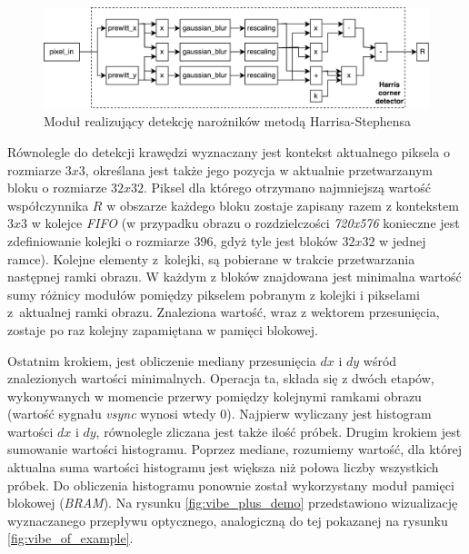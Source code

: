	\begin{figure}[h!]
		\centering
		\includegraphics[scale=0.6]{img/4/harris_detector.pdf}
		\caption{Moduł realizujący detekcję narożników metodą Harrisa-Stephensa}
		\label{fig:harris_diagram}
	\end{figure}

Równolegle do detekcji krawędzi wyznaczany jest kontekst aktualnego piksela o rozmiarze $3x3$, określana jest także jego pozycja w aktualnie przetwarzanym bloku o rozmiarze $32x32$. Piksel dla którego otrzymano najmniejszą wartość współczynnika $R$ w obszarze każdego bloku zostaje zapisany razem z kontekstem $3x3$ w kolejce \textit{FIFO} (w przypadku obrazu o rozdzielczości \textit{720x576} konieczne jest zdefiniowanie kolejki o rozmiarze 396, gdyż tyle jest bloków $32x32$ w jednej ramce). Kolejne elementy z~kolejki, są pobierane w trakcie przetwarzania następnej ramki obrazu. W każdym z bloków znajdowana jest minimalna wartość sumy różnicy modułów pomiędzy pikselem pobranym z kolejki i pikselami z~aktualnej ramki obrazu. Znaleziona wartość, wraz z wektorem przesunięcia, zostaje po raz kolejny zapamiętana w pamięci blokowej. 

Ostatnim krokiem, jest obliczenie mediany przesunięcia $dx$ i $dy$ wśród znalezionych wartości minimalnych. Operacja ta, składa się z dwóch etapów, wykonywanych w momencie przerwy pomiędzy kolejnymi ramkami obrazu (wartość sygnału \textit{vsync} wynosi wtedy $0$). Najpierw wyliczany jest histogram wartości $dx$ i $dy$, równolegle zliczana jest także ilość próbek. Drugim krokiem jest sumowanie wartości histogramu. Poprzez mediane, rozumiemy wartość, dla której aktualna suma wartości histogramu jest większa niż połowa liczby wszystkich próbek. Do obliczenia histogramu ponownie został wykorzystany moduł pamięci blokowej (\textit{BRAM}). Na rysunku \ref{fig:vibe_plus_demo} przedstawiono wizualizację wyznaczanego przepływu optycznego, analogiczną do tej pokazanej na rysunku \ref{fig:vibe_of_example}.

